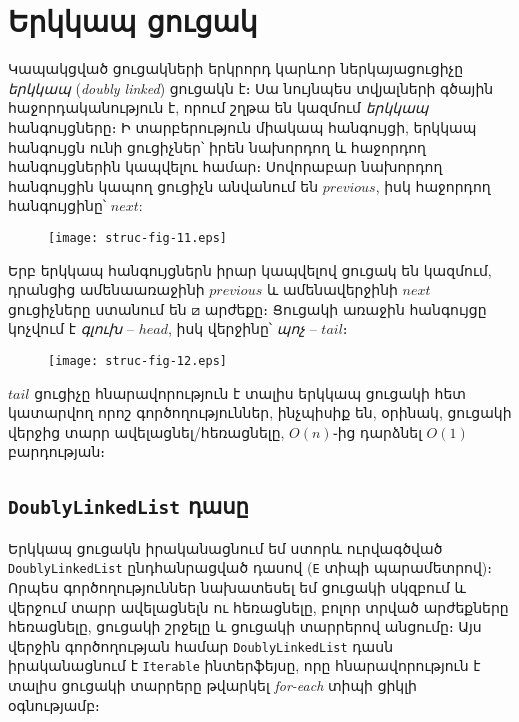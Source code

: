 %
%
\section{Երկկապ ցուցակ}
\label{sec:doubly}

Կապակցված ցուցակների երկրորդ կարևոր ներկայացուցիչը 
\emph{երկկապ} (\emph{doubly linked}) ցուցակն է։ Սա նույնպես 
տվյալների գծային հաջորդականություն է, որում շղթա են կազմում 
\emph{երկկապ} հանգույցները։ Ի տարբերություն միակապ հանգույցի, 
երկկապ հանգույցն ունի ցուցիչներ՝ իրեն նախորդող և հաջորդող 
հանգույցներին կապվելու համար։ Սովորաբար նախորդող հանգույցին 
կապող ցուցիչն անվանում են \(previous\), իսկ հաջորդող 
հանգույցինը՝ \(next\):

\begin{figure}[h]
\centering
\texttt{[image: struc-fig-11.eps]}
\end{figure}

Երբ երկկապ հանգույցներն իրար կապվելով ցուցակ են կազմում, 
դրանցից ամենաառաջինի \(previous\) և ամենավերջինի \(next\) 
ցուցիչները ստանում են \(\boxslash\) արժեքը։ Ցուցակի առաջին
հանգույցը կոչվում է \emph{գլուխ} -- \(head\), իսկ վերջինը՝ 
\emph{պոչ} -- \(tail\)։ 

\begin{figure}[h]
\centering
\texttt{[image: struc-fig-12.eps]}
\end{figure}

\(tail\) ցուցիչը հնարավորություն է տալիս երկկապ ցուցակի 
հետ կատարվող որոշ գործողություններ, ինչպիսիք են, օրինակ, 
ցուցակի վերջից տարր ավելացնել/հեռացնելը, \(O(n)\)֊ից դարձնել
\(O(1)\) բարդության։

%
%
\subsection{\texttt{DoublyLinkedList} դասը}

Երկկապ ցուցակն իրականացնում եմ ստորև ուրվագծված 
\texttt{DoublyLinkedList} ընդհանրացված դասով (\texttt{E} 
տիպի պարամետրով)։ Որպես գործողություններ նախատեսել եմ
ցուցակի սկզբում և վերջում տարր ավելացնելն ու հեռացնելը,
բոլոր տրված արժեքները հեռացնելը, ցուցակի շրջելը և 
ցուցակի տարրերով անցումը։ Այս վերջին գործողության համար 
\texttt{DoublyLinkedList} դասն իրականացնում է \texttt{Iterable}
ինտերֆեյսը, որը հնարավորություն է տալիս ցուցակի տարրերը 
թվարկել \textit{for-each} տիպի ցիկլի օգնությամբ։

